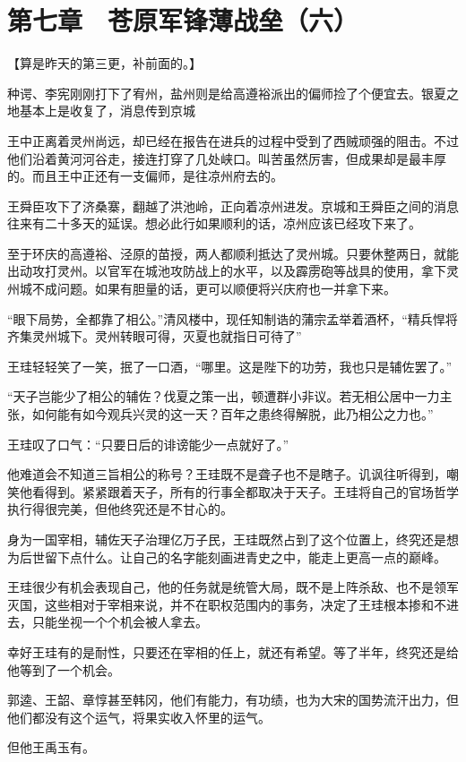 \section{第七章　苍原军锋薄战垒（六）}

【算是昨天的第三更，补前面的。】

种谔、李宪刚刚打下了宥州，盐州则是给高遵裕派出的偏师捡了个便宜去。银夏之地基本上是收复了，消息传到京城

王中正离着灵州尚远，却已经在报告在进兵的过程中受到了西贼顽强的阻击。不过他们沿着黄河河谷走，接连打穿了几处峡口。叫苦虽然厉害，但成果却是最丰厚的。而且王中正还有一支偏师，是往凉州府去的。

王舜臣攻下了济桑寨，翻越了洪池岭，正向着凉州进发。京城和王舜臣之间的消息往来有二十多天的延误。想必此行如果顺利的话，凉州应该已经攻下来了。

至于环庆的高遵裕、泾原的苗授，两人都顺利抵达了灵州城。只要休整两日，就能出动攻打灵州。以官军在城池攻防战上的水平，以及霹雳砲等战具的使用，拿下灵州城不成问题。如果有胆量的话，更可以顺便将兴庆府也一并拿下来。

“眼下局势，全都靠了相公。”清风楼中，现任知制诰的蒲宗孟举着酒杯，“精兵悍将齐集灵州城下。灵州转眼可得，灭夏也就指日可待了”

王珪轻轻笑了一笑，抿了一口酒，“哪里。这是陛下的功劳，我也只是辅佐罢了。”

“天子岂能少了相公的辅佐？伐夏之策一出，顿遭群小非议。若无相公居中一力主张，如何能有如今观兵兴灵的这一天？百年之患终得解脱，此乃相公之力也。”

王珪叹了口气：“只要日后的诽谤能少一点就好了。”

他难道会不知道三旨相公的称号？王珪既不是聋子也不是瞎子。讥讽往听得到，嘲笑他看得到。紧紧跟着天子，所有的行事全都取决于天子。王珪将自己的官场哲学执行得很完美，但他终究还是不甘心的。

身为一国宰相，辅佐天子治理亿万子民，王珪既然占到了这个位置上，终究还是想为后世留下点什么。让自己的名字能刻画进青史之中，能走上更高一点的巅峰。

王珪很少有机会表现自己，他的任务就是统管大局，既不是上阵杀敌、也不是领军灭国，这些相对于宰相来说，并不在职权范围内的事务，决定了王珪根本掺和不进去，只能坐视一个个机会被人拿去。

幸好王珪有的是耐性，只要还在宰相的任上，就还有希望。等了半年，终究还是给他等到了一个机会。

郭逵、王韶、章惇甚至韩冈，他们有能力，有功绩，也为大宋的国势流汗出力，但他们都没有这个运气，将果实收入怀里的运气。

但他王禹玉有。

